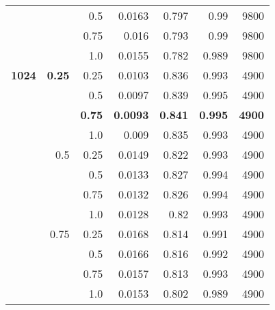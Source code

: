 \begin{table}[H]
{\begin{tabular}{rrrrrrr}
              &               & 0.5           & 0.0163               & 0.797                   & 0.99                    & 9800          \\
              &               & 0.75          & 0.016                & 0.793                   & 0.99                    & 9800          \\
              &               & 1.0           & 0.0155               & 0.782                   & 0.989                   & 9800          \\
\textbf{1024} & \textbf{0.25}          & 0.25          & 0.0103               & 0.836                   & 0.993                   & 4900          \\
              &               & 0.5           & 0.0097               & 0.839                   & 0.995                   & 4900          \\
              &               & \textbf{0.75} & \textbf{0.0093}      & \textbf{0.841}          & \textbf{0.995}          & \textbf{4900} \\
              &               & 1.0           & 0.009                & 0.835                   & 0.993                   & 4900          \\
              & 0.5           & 0.25          & 0.0149               & 0.822                   & 0.993                   & 4900          \\
              &               & 0.5           & 0.0133               & 0.827                   & 0.994                   & 4900          \\
              &               & 0.75          & 0.0132               & 0.826                   & 0.994                   & 4900          \\
              &               & 1.0           & 0.0128               & 0.82                    & 0.993                   & 4900          \\
              & 0.75          & 0.25          & 0.0168               & 0.814                   & 0.991                   & 4900          \\
              &               & 0.5           & 0.0166               & 0.816                   & 0.992                   & 4900          \\
              &               & 0.75          & 0.0157               & 0.813                   & 0.993                   & 4900          \\
              &               & 1.0           & 0.0153               & 0.802                   & 0.989                   & 4900          \\

\end{tabular}}
\end{table}
